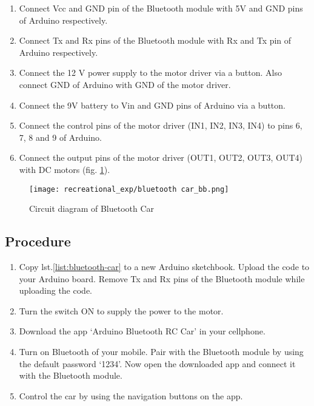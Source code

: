 \begin{enumerate}[leftmargin=*]
    \item Connect Vcc and GND pin of the Bluetooth module with 5V and GND pins of Arduino respectively. 
    \item Connect Tx and Rx pins of the Bluetooth module with Rx and Tx pin of Arduino respectively. 
    \item Connect the 12 V power supply to the motor driver via a button. Also connect GND of Arduino with GND of the motor driver.
    \item Connect the 9V battery to Vin and GND pins of Arduino via a button. 
    \item Connect the control pins of the motor driver (IN1, IN2, IN3, IN4) to pins 6, 7, 8 and 9 of Arduino.
    \item Connect the output pins of the motor driver (OUT1, OUT2, OUT3, OUT4) with DC motors (fig. \ref{fig:bt-car}).
\end{enumerate}

	\begin{figure}[H]
	\centering \texttt{[image: recreational\_exp/bluetooth car\_bb.png]}
	\caption{Circuit diagram of Bluetooth Car}
	\label{fig:bt-car}
	\end{figure}
	
\subsection*{Procedure}
\begin{enumerate}[leftmargin=*] 
    \item Copy lst.\ref{list:bluetooth-car} to a new Arduino sketchbook. Upload the code to your Arduino board. Remove Tx and Rx pins of the Bluetooth module while uploading the code.
    \item Turn the switch ON to supply the power to the motor.
    \item Download the app `Arduino Bluetooth RC Car' in your cellphone. 
    \item Turn on Bluetooth of your mobile. Pair with the Bluetooth module by using the default password `1234'. Now open the downloaded app and connect it with the Bluetooth module. 
    \item Control the car by using the navigation buttons on the app.  
\end{enumerate}

